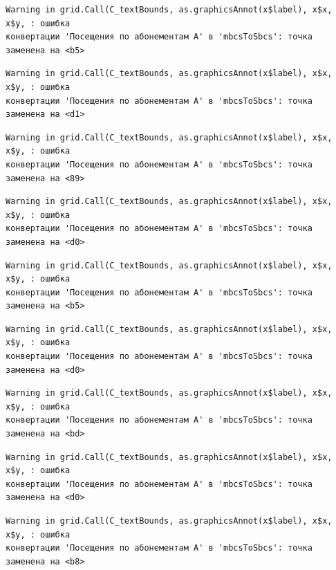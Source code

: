 \documentclass[
  letterpaper,
  DIV=11,
  numbers=noendperiod]{scrreprt}
\begin{document}
\begin{verbatim}
Warning in grid.Call(C_textBounds, as.graphicsAnnot(x$label), x$x, x$y, : ошибка
конвертации 'Посещения по абонементам А' в 'mbcsToSbcs': точка заменена на <b5>
\end{verbatim}

\begin{verbatim}
Warning in grid.Call(C_textBounds, as.graphicsAnnot(x$label), x$x, x$y, : ошибка
конвертации 'Посещения по абонементам А' в 'mbcsToSbcs': точка заменена на <d1>
\end{verbatim}

\begin{verbatim}
Warning in grid.Call(C_textBounds, as.graphicsAnnot(x$label), x$x, x$y, : ошибка
конвертации 'Посещения по абонементам А' в 'mbcsToSbcs': точка заменена на <89>
\end{verbatim}

\begin{verbatim}
Warning in grid.Call(C_textBounds, as.graphicsAnnot(x$label), x$x, x$y, : ошибка
конвертации 'Посещения по абонементам А' в 'mbcsToSbcs': точка заменена на <d0>
\end{verbatim}

\begin{verbatim}
Warning in grid.Call(C_textBounds, as.graphicsAnnot(x$label), x$x, x$y, : ошибка
конвертации 'Посещения по абонементам А' в 'mbcsToSbcs': точка заменена на <b5>
\end{verbatim}

\begin{verbatim}
Warning in grid.Call(C_textBounds, as.graphicsAnnot(x$label), x$x, x$y, : ошибка
конвертации 'Посещения по абонементам А' в 'mbcsToSbcs': точка заменена на <d0>
\end{verbatim}

\begin{verbatim}
Warning in grid.Call(C_textBounds, as.graphicsAnnot(x$label), x$x, x$y, : ошибка
конвертации 'Посещения по абонементам А' в 'mbcsToSbcs': точка заменена на <bd>
\end{verbatim}

\begin{verbatim}
Warning in grid.Call(C_textBounds, as.graphicsAnnot(x$label), x$x, x$y, : ошибка
конвертации 'Посещения по абонементам А' в 'mbcsToSbcs': точка заменена на <d0>
\end{verbatim}

\begin{verbatim}
Warning in grid.Call(C_textBounds, as.graphicsAnnot(x$label), x$x, x$y, : ошибка
конвертации 'Посещения по абонементам А' в 'mbcsToSbcs': точка заменена на <b8>
\end{verbatim}
\end{document}
